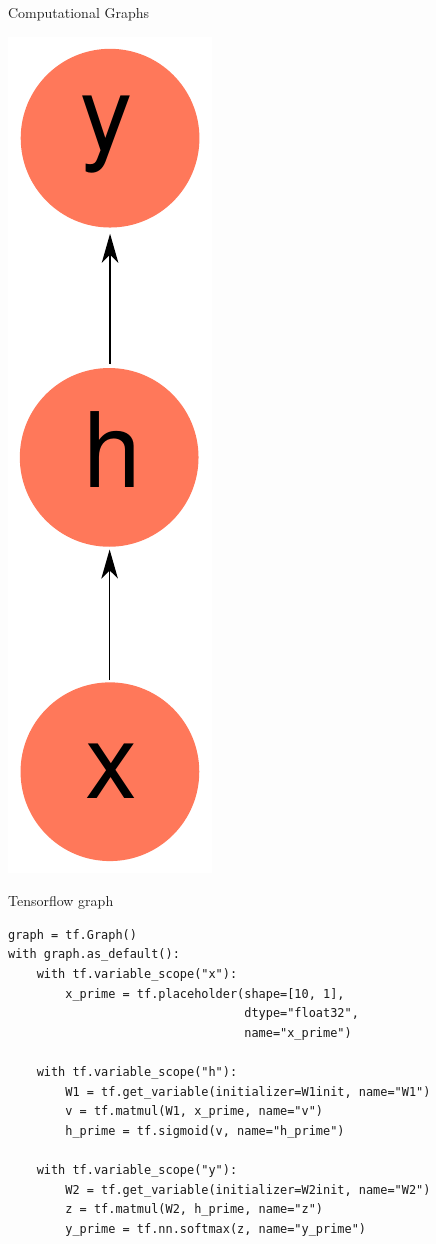 \documentclass[10pt]{beamer}
\begin{document}
\begin{frame}[fragile]{Computational Graphs}
\begin{center}
\includegraphics[scale=0.58]{images/CompGraph4.pdf}
\end{center}
\end{frame}



\begin{frame}[fragile]{Tensorflow graph}
\begin{verbatim}
graph = tf.Graph() 
with graph.as_default():
    with tf.variable_scope("x"):
        x_prime = tf.placeholder(shape=[10, 1],
                                 dtype="float32",
                                 name="x_prime") 

    with tf.variable_scope("h"):
        W1 = tf.get_variable(initializer=W1init, name="W1")
        v = tf.matmul(W1, x_prime, name="v")
        h_prime = tf.sigmoid(v, name="h_prime")

    with tf.variable_scope("y"):
        W2 = tf.get_variable(initializer=W2init, name="W2")
        z = tf.matmul(W2, h_prime, name="z")
        y_prime = tf.nn.softmax(z, name="y_prime")
\end{verbatim}
\end{frame}
\end{document}
